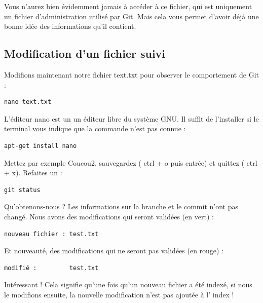 \documentclass{article}
\begin{document}
Vous n'aurez bien évidemment jamais à accéder à ce fichier, qui est uniquement un fichier d'administration utilisé par {\color{blue} Git}. Mais cela vous permet d'avoir déjà une bonne idée des informations qu'il contient.

\subsection{Modification d'un fichier suivi}
Modifions maintenant notre fichier {\color{blue} text.txt} pour observer le comportement de {\color{blue} Git} :


\begin{verbatim}
nano text.txt
\end{verbatim}

L'éditeur {\color{blue} nano} est un un éditeur libre du système {\color{blue} GNU}. Il suffit de l'installer si le terminal vous indique que la commande n'est pas connue :


\begin{verbatim}
apt-get install nano
\end{verbatim}

Mettez par exemple {\color{blue} Coucou2}, sauvegardez ({\color{blue} ctrl + o} puis entrée) et quittez ({\color{blue} ctrl + x}). Refaites un :

\begin{verbatim}
git status
\end{verbatim}

Qu'obtenons-nous ? Les informations sur la branche et le {\color{blue} commit} n'ont pas changé. Nous avons des modifications qui seront validées (en {\color{blue} vert}) :

\begin{verbatim}
nouveau fichier : test.txt
\end{verbatim}

Et nouveauté, des modifications qui ne seront pas validées (en rouge) :

\begin{verbatim}
modifié :         test.txt
\end{verbatim}

Intéressant ! Cela signifie qu'une fois qu'un nouveau fichier a été indexé, si nous le modifions ensuite, la nouvelle modification n'est pas ajoutée à l'{\color{blue} index} !
\end{document}
